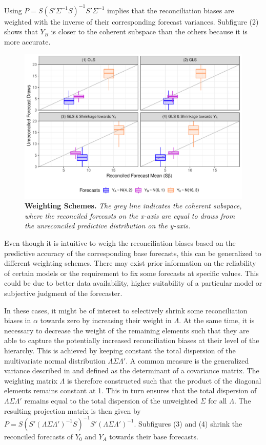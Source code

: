 \documentclass[a4paper,fleqn,11pt]{article}
\begin{document}
Using $P = S(S'\Sigma^{-1}S)^{-1}S'\Sigma^{-1}$ implies that the reconciliation biases are weighted with the inverse of their corresponding forecast variances. Subfigure (2) shows that $Y_B$ is closer to the coherent subspace than the others because it is more accurate. 
\begin{figure}[H]
	\includegraphics[width=\textwidth]{fig/fig_biases}
	\caption[Weighting Schemes]{\textbf{Weighting Schemes.} \textit{The grey line indicates the coherent subspace, where the reconciled forecasts on the x-axis are equal to draws from the unreconciled predictive distribution on the y-axis.}}\label{fig:weights}
\end{figure}
Even though it is intuitive to weigh the reconciliation biases based on the predictive accuracy of the corresponding base forecasts, this can be generalized to different weighting schemes. There may exist prior information on the reliability of certain models or the requirement to fix some forecasts at specific values. This could be due to better data availability, higher suitability of a particular model or subjective judgment of the forecaster. 

In these cases, it might be of interest to selectively shrink some reconciliation biases in $\alpha$ towards zero by increasing their weight in $\Lambda$. At the same time, it is necessary to decrease the weight of the remaining elements such that they are able to capture the potentially increased reconciliation biases at their level of the hierarchy. This is achieved by keeping constant the total dispersion of the  multivariate normal distribution $\Lambda\Sigma\Lambda'$. A common measure is the generalized variance described in \cite{Mustonen1997} and defined as the determinant of a covariance matrix. The weighting matrix $\Lambda$ is therefore constructed such that the product of the diagonal elements remains constant at 1. This in turn ensures that the total dispersion of $\Lambda\Sigma\Lambda'$ remains equal to the total dispersion of the unweighted $\Sigma$ for all $\Lambda$. The resulting projection matrix is then given by  $P= S(S'(\Lambda\Sigma\Lambda')^{-1}S)^{-1}S'(\Lambda\Sigma\Lambda')^{-1}$. Subfigures (3) and (4) shrink the reconciled forecasts of $Y_0$ and $Y_A$ towards their base forecasts.
\end{document}
